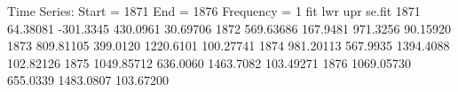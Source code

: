 \begin{Schunk}
\begin{Soutput}
Time Series:
Start = 1871 
End = 1876 
Frequency = 1 
            fit       lwr       upr    se.fit
1871   64.38081 -301.3345  430.0961  30.69706
1872  569.63686  167.9481  971.3256  90.15920
1873  809.81105  399.0120 1220.6101 100.27741
1874  981.20113  567.9935 1394.4088 102.82126
1875 1049.85712  636.0060 1463.7082 103.49271
1876 1069.05730  655.0339 1483.0807 103.67200
\end{Soutput}
\end{Schunk}
